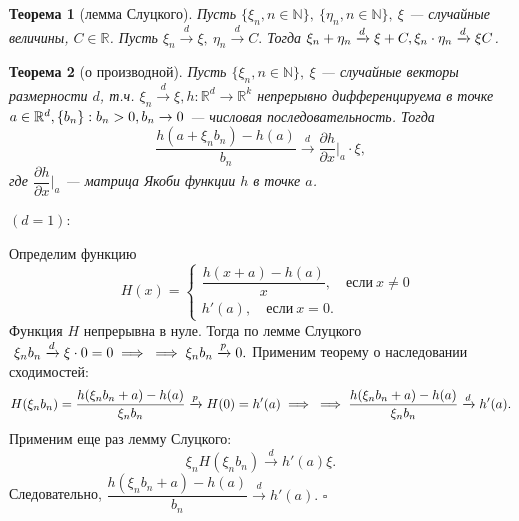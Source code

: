 \documentclass[12pt]{report}
\renewenvironment{proof}{{\bfseries Доказательство:}}{$\square$\\\\}
\newtheorem{theorem}{Теорема}
\theoremstyle{definition}
\begin{document}
\begin{theorem}[лемма Слуцкого]
	Пусть $\{\xi_n, n \in \mathbb{N}\},\ \{\eta_n, n \in \mathbb{N}\},\ \xi$ — случайные величины, $C \in \mathbb{R}$. Пусть $\xi_n \xrightarrow{d} \xi, \ \eta_n \xrightarrow{d} C.$ Тогда $\xi_n + \eta_n  \xrightarrow{d} \xi + C,\\ \xi_n \cdot \eta_n  \xrightarrow{d} \xi C$. 
\end{theorem}

\begin{theorem}[о производной]
	Пусть $\{\xi_n, n \in \mathbb{N}\},\ \xi$ — случайные векторы размерности $d$, т.ч. $\xi_n \xrightarrow{d} \xi, h: \mathbb{R}^d \rightarrow \mathbb{R}^k$ 
непрерывно дифференцируема в точке $a \in \mathbb{R}^d,\\ \{b_n \}: b_n > 0, b_n \rightarrow 0$ — числовая последовательность. Тогда  
$$\dfrac{h(a + \xi_n b_n) - h(a)}{b_n} \xrightarrow{d} \dfrac{\partial h}{\partial x}\Bigr\rvert_a \cdot \xi, $$  
где $\dfrac{\partial h}{\partial x}\Bigr\rvert_a$ — матрица Якоби функции $h$ в точке $a$.
\end{theorem}
\begin{proof}
	$(d = 1)$:

	Определим функцию 
	$$\quad H(x) = \begin{cases}
	\dfrac{h(x+a) - h(a)}{x},\quad если\ x \neq 0 \\
	h'(a), \quad если \ x = 0.
	\end{cases} $$  
	Функция $H$ непрерывна в нуле. Тогда по лемме Слуцкого $\ \xi_n b_n \xrightarrow{d} \xi \cdot 0 = 0 \implies \\ \implies \xi_n b_n \xrightarrow{p} 0.$ Применим теорему о наследовании сходимостей:
	$$ H(\xi_n b_n) = \dfrac{h(\xi_n b_n+a) - h(a)}{\xi_n b_n} \xrightarrow{p} H(0) = h'(a) \implies \\ \implies  \dfrac{h(\xi_n b_n+a) - h(a)}{\xi_n b_n} \xrightarrow{d} h'(a). $$
	Применим еще раз лемму Слуцкого:
	$$ \xi_n H(\xi_n b_n) \xrightarrow{d} h'(a)\xi. $$
	Следовательно, $\dfrac{h(\xi_n b_n+a) - h(a)}{b_n} \xrightarrow{d} h'(a).$
\end{proof}
\end{document}
